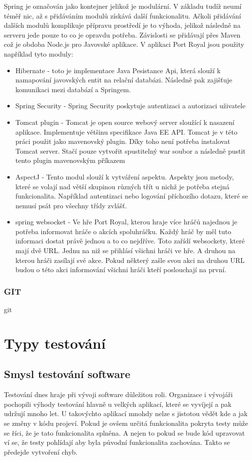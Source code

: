 \documentclass[czech,master,public,dept460,male,cpdeclaration,twoside]{diploma}
\begin{document}
Spring je označován jako kontejner jelikož je modulární. V základu tudíž neumí téměř nic, až s přidáváním modulů získává další funkcionalitu. Ačkoli  přidávání dalších modulů komplikuje přípravu prostředí je to výhoda, jelikož následně na serveru jede pouze to co je opravdu potřeba. Závislosti se přidávají přes Maven což je obdoba Node.js pro Javovské aplikace. V aplikaci Port Royal jsou použity například tyto moduly:
\begin{itemize}
	\item Hibernate - toto je implementace Java Pesistance Api, která slouží k namapování javovských entit na relační databázi. Následně pak zajišťuje komunikaci mezi databází a Springem.
	\item Spring Security - Spring Security poskytuje autentizaci a autorizaci uživatele
	\item Tomcat plugin - Tomcat je open source webový server sloužící k nasazení aplikace. Implementuje většinu specifikace Java EE API. Tomcat je v této práci použit jako mavenovský plugin. Díky toho není potřeba instalovat Tomcat server. Stačí pouze vytvořit spustitelný war soubor a následně pustit tento plugin mavenovským příkazem	
	\item AspectJ - Tento modul slouží k vytváření aspektu. Aspekty jsou metody, které se volají nad větší skupinou různých třít u nichž je potřeba stejná funkcionalita. Například autentizaci nebo logování příchozího dotazu, které se nemusí psát pro všechny třídy zvlášť.
	\item spring websocket - Ve hře Port Royal, kterou hraje více hráčů najednou je potřeba informovat hráče o akcích spoluhráčku. Každý hráč by měl tuto informaci dostat právě jednou a to co nejdříve. Toto zařídí websockety, které mají dvě URL. Jednu na niž se přihlásí všichni hráči ve hře. A druhou na kterou hráči zasílají své akce. Pokud některý zašle svou akci na druhou URL budou o této akci informování všichni hráči kteří poslouchají na první.
\end{itemize}

\subsubsection{GIT}
git

\section{Typy testování}

\subsection{Smysl testování software}
Testování dnes hraje při vývoji software důležitou roli. Organizace i vývojáři pochopili výhody testování hlavně u velkých aplikací, které se vyvíjejí a pak udržují mnoho let. U takovýchto aplikací mnohdy nelze s jistotou vědět kde a jak se změny v kódu projeví. Pokud je ovšem určitá funkcionalita pokryta testy může se říci, že je tato funkcionalita splněna. A nejen to pokud se bude kód upravovat ví se, že testy pohlídají aby byla původní funkcionalita zachována. Takto se předejde vytvoření chyb.
\end{document}
